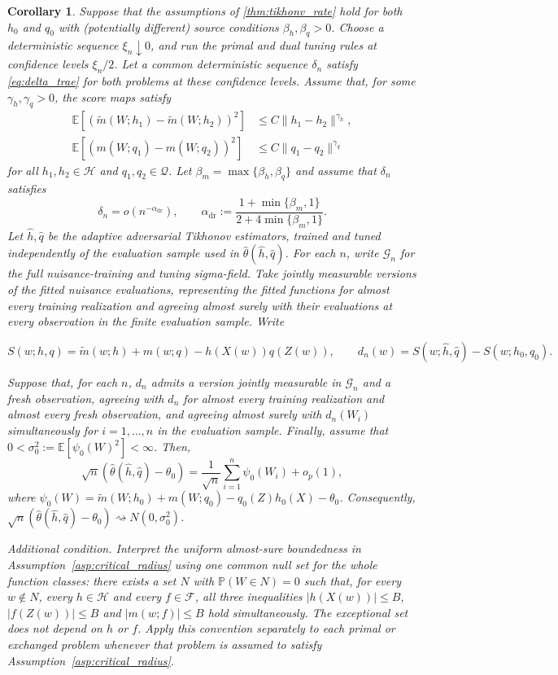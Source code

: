 \documentclass[12pt]{article}
\theoremstyle{plain}
\newtheorem{corollary}[theorem]{Corollary}
\theoremstyle{definition}
\theoremstyle{remark}
\begin{document}
\begin{corollary} \label{cor:normality}
Suppose that the assumptions of \cref{thm:tikhonv_rate} hold for both $h_0$ and $q_0$ with (potentially different) source conditions $\beta_h,\beta_q>0$. Choose a deterministic sequence $\xi_n\downarrow0$, and run the primal and dual tuning rules at confidence levels $\xi_n/2$. Let a common deterministic sequence $\delta_n$ satisfy \eqref{eq:delta_trae} for both problems at these confidence levels. Assume that, for some $\gamma_h,\gamma_q>0$, the score maps satisfy
\begin{align*}
\mathbb{E}\left[\left(\tilde{m}( W;h_{1}) -\tilde{m}( W;h_{2})\right)^{2}\right] & \leqslant C\| h_{1} -h_{2} \| ^{\gamma_h },\\
\mathbb{E}\left[\left(m( W;q_{1}) -m( W;q_{2})\right)^{2}\right] & \leqslant C\| q_{1} -q_{2} \| ^{\gamma_q }
\end{align*}
for all $h_1,h_2\in\mathcal H$ and $q_1,q_2\in\mathcal Q$. Let $\beta_m=\max\{\beta_h,\beta_q\}$ and assume that $\delta_n$ satisfies
\[
\delta _{n} =o\left( n^{-\alpha _{\mathrm{dr}}}\right) ,\qquad
\alpha _{\mathrm{dr}} :=\frac{1+\min\{\beta _{m} ,1\}}{2+4\min\{\beta _{m} ,1\}} .
\]
Let $\hat h,\hat q$ be the adaptive adversarial Tikhonov estimators, trained and tuned independently of the evaluation sample used in $\hat\theta(\hat h,\hat q)$. For each $n$, write $\mathcal G_n$ for the full nuisance-training and tuning sigma-field. Take jointly measurable versions of the fitted nuisance evaluations, representing the fitted functions for almost every training realization and agreeing almost surely with their evaluations at every observation in the finite evaluation sample. Write

\[
S(w;h,q)=\tilde m(w;h)+m(w;q)-h(X(w))q(Z(w)),\qquad
 d_n(w)=S(w;\hat h,\hat q)-S(w;h_0,q_0).
\]

Suppose that, for each $n$, $d_n$ admits a version jointly measurable in $\mathcal G_n$ and a fresh observation, agreeing with $d_n$ for almost every training realization and almost every fresh observation, and agreeing almost surely with $d_n(W_i)$ simultaneously for $i=1,\ldots,n$ in the evaluation sample. Finally, assume that $0<\sigma_0^2:=\mathbb E[\psi_0(W)^2]<\infty$. Then,
\[
\sqrt{n}(\hat{\theta }(\hat{h},\hat{q}) -\theta _{0}) =\frac{1}{\sqrt{n}}\sum _{i=1}^{n} \psi _{0}( W_i) +o_{p}( 1) ,
\]
where $\psi _{0}( W) =\tilde{m}( W;h_{0}) +m( W;q_{0}) -q_{0}( Z) h_{0}( X) -\theta _{0}$. Consequently, $\sqrt n(\hat\theta(\hat h,\hat q)-\theta_0)\rightsquigarrow N(0,\sigma_0^2)$.

\emph{Additional condition.} Interpret the uniform almost-sure boundedness in Assumption~\ref{asp:critical_radius} using one common null set for the whole function classes: there exists a set $N$ with $\mathbb P(W\in N)=0$ such that, for every $w\notin N$, every $h\in\mathcal H$ and every $f\in\mathcal F$, all three inequalities $|h(X(w))|\leqslant B$, $|f(Z(w))|\leqslant B$ and $|m(w;f)|\leqslant B$ hold simultaneously. The exceptional set does not depend on $h$ or $f$. Apply this convention separately to each primal or exchanged problem whenever that problem is assumed to satisfy Assumption~\ref{asp:critical_radius}.
\end{corollary}
\end{document}
